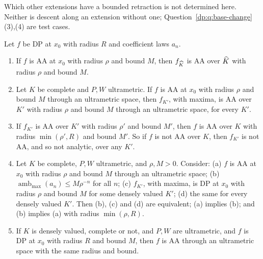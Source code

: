 Which other extensions have a bounded retraction is not determined here. Neither is descent along an extension without one; Question~\ref{dp:q:base-change}(3),(4) are test cases.

\begin{theorem}\label{dp:thm:aa-base-change}
Let $f$ be DP at $x_0$ with radius $R$ and coefficient laws $a_n$.
\begin{enumerate}
\item If $f$ is AA at $x_0$ with radius $\rho$ and bound $M$, then $f_{\widehat K}$ is AA over $\widehat K$ with radius $\rho$ and bound $M$.
\item Let $K$ be complete and $P,W$ ultrametric. If $f$ is AA at $x_0$ with radius $\rho$ and bound $M$ through an ultrametric space, then $f_{K'}$, with maxima, is AA over $K'$ with radius $\rho$ and bound $M$ through an ultrametric space, for every $K'$.
\item If $f_{K'}$ is AA over $K'$ with radius $\rho'$ and bound $M'$, then $f$ is AA over $K$ with radius $\min(\rho',R)$ and bound $M'$. So if $f$ is not AA over $K$, then $f_{K'}$ is not AA, and so not analytic, over any $K'$.
\item Let $K$ be complete, $P,W$ ultrametric, and $\rho,M>0$. Consider: \textup{(a)} $f$ is AA at $x_0$ with radius $\rho$ and bound $M$ through an ultrametric space; \textup{(b)} $\operatorname{amb}_{\max}(a_n)\le M\rho^{-n}$ for all $n$; \textup{(c)} $f_{K'}$, with maxima, is DP at $x_0$ with radius $\rho$ and bound $M$ for some densely valued $K'$; \textup{(d)} the same for every densely valued $K'$. Then \textup{(b)}, \textup{(c)} and \textup{(d)} are equivalent; \textup{(a)} implies \textup{(b)}; and \textup{(b)} implies \textup{(a)} with radius $\min(\rho,R)$.
\item If $K$ is densely valued, complete or not, and $P,W$ are ultrametric, and $f$ is DP at $x_0$ with radius $R$ and bound $M$, then $f$ is AA through an ultrametric space with the same radius and bound.
\end{enumerate}
\end{theorem}


